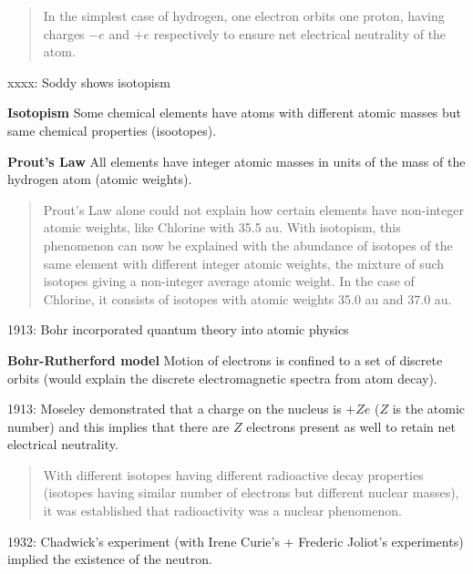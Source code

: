 \documentclass[11pt]{article}
\theoremstyle{definition}
\begin{document}
\begin{quote}
    In the simplest case of hydrogen, one electron orbits one proton, having charges $-e$ and $+e$ respectively to ensure net electrical neutrality of the atom.
\end{quote}

xxxx: Soddy shows isotopism

\begin{shaded}
    \textbf{Isotopism} \newline
    Some chemical elements have atoms with different atomic masses but same chemical properties (isootopes).

    \textbf{Prout's Law} \newline
    All elements have integer atomic masses in units of the mass of the hydrogen atom (atomic weights).
\end{shaded}

\begin{quote}
    Prout's Law alone could not explain how certain elements have non-integer atomic weights, like Chlorine with 35.5 au. With isotopism, this phenomenon can now be explained with the abundance of isotopes of the same element with different integer atomic weights, the mixture of such isotopes giving a non-integer average atomic weight. In the case of Chlorine, it consists of isotopes with atomic weights 35.0 au and 37.0 au.
\end{quote}

1913: Bohr incorporated quantum theory into atomic physics

\begin{shaded}
    \textbf{Bohr-Rutherford model} \newline
    Motion of electrons is confined to a set of discrete orbits (would explain the discrete electromagnetic spectra from atom decay).
\end{shaded}

1913: Moseley demonstrated that a charge on the nucleus is $+Ze$ ($Z$ is the atomic number) and this implies that there are $Z$ electrons present as well to retain net electrical neutrality. 

\begin{quote}
    With different isotopes having different radioactive decay properties (isotopes having similar number of electrons but different nuclear masses), it was established that radioactivity was a nuclear phenomenon.
\end{quote}

1932: Chadwick's experiment (with Irene Curie's + Frederic Joliot's experiments) implied the existence of the neutron.
\end{document}
